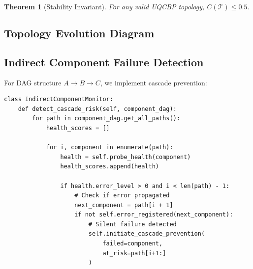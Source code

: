 \documentclass[11pt,a4paper]{article}
\newtheorem{theorem}{Theorem}
\begin{document}
\begin{theorem}[Stability Invariant]
For any valid UQCBP topology, $C(\mathcal{T}) \leq 0.5$.
\end{theorem}

\subsection{Topology Evolution Diagram}

\begin{center}
\end{center}

\subsection{Indirect Component Failure Detection}

For DAG structure $A \to B \to C$, we implement cascade prevention:

\begin{verbatim}
class IndirectComponentMonitor:
    def detect_cascade_risk(self, component_dag):
        for path in component_dag.get_all_paths():
            health_scores = []
            
            for i, component in enumerate(path):
                health = self.probe_health(component)
                health_scores.append(health)
                
                if health.error_level > 0 and i < len(path) - 1:
                    # Check if error propagated
                    next_component = path[i + 1]
                    if not self.error_registered(next_component):
                        # Silent failure detected
                        self.initiate_cascade_prevention(
                            failed=component,
                            at_risk=path[i+1:]
                        )
\end{verbatim}
\end{document}
